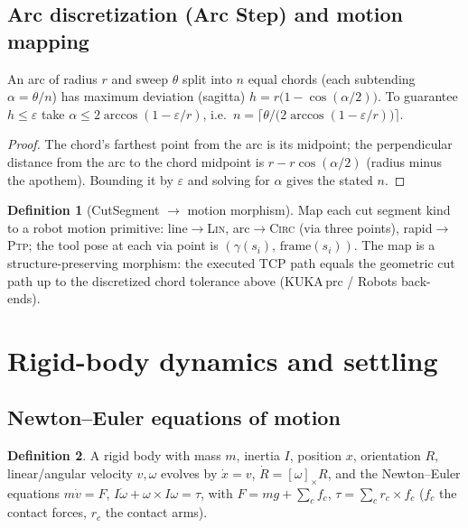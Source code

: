 \documentclass[11pt]{article}
\theoremstyle{definition}\newtheorem{definition}{Definition}[section]
\theoremstyle{plain}\newtheorem{theorem}{Theorem}[section]
\begin{document}
\subsection{Arc discretization (Arc Step) and motion mapping}
\begin{proposition}
An arc of radius $r$ and sweep $\theta$ split into $n$ equal chords (each subtending $\alpha=\theta/n$) has
maximum deviation (sagitta) $h=r\big(1-\cos(\alpha/2)\big)$. To guarantee $h\le\varepsilon$ take
$\alpha\le2\arccos(1-\varepsilon/r)$, i.e.\ $n=\big\lceil \theta/\big(2\arccos(1-\varepsilon/r)\big)\big\rceil$.
\end{proposition}
\begin{proof}
The chord's farthest point from the arc is its midpoint; the perpendicular distance from the arc to the chord
midpoint is $r-r\cos(\alpha/2)$ (radius minus the apothem). Bounding it by $\varepsilon$ and solving for
$\alpha$ gives the stated $n$.
\end{proof}
\begin{definition}[CutSegment $\to$ motion morphism]
Map each cut segment kind to a robot motion primitive: line$\to$\textsc{Lin}, arc$\to$\textsc{Circ} (via three
points), rapid$\to$\textsc{Ptp}; the tool pose at each via point is $(\gamma(s_i),\,\text{frame}(s_i))$. The map
is a structure-preserving morphism: the executed TCP path equals the geometric cut path up to the discretized
chord tolerance above (KUKA\,prc / Robots back-ends).
\end{definition}

\section{Rigid-body dynamics and settling}
\subsection{Newton--Euler equations of motion}
\begin{definition}
A rigid body with mass $m$, inertia $I$, position $x$, orientation $R$, linear/angular velocity $v,\omega$
evolves by $\dot x=v$, $\dot R=[\omega]_\times R$, and the Newton--Euler equations
$m\dot v=F$, $I\dot\omega+\omega\times I\omega=\tau$, with $F=mg+\sum_c f_c$, $\tau=\sum_c r_c\times f_c$
($f_c$ the contact forces, $r_c$ the contact arms).
\end{definition}
\end{document}
